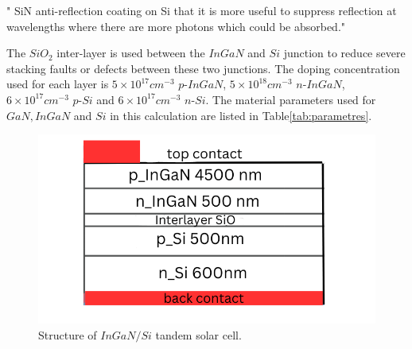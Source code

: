 \documentclass[preprint,12pt]{elsarticle}
\begin{document}
" SiN anti-reflection coating on Si that it is more useful to suppress reflection at wavelengths where there are more photons which could be  absorbed."

The $SiO_{2}$ inter-layer is used between the $InGaN$ and $Si$ junction to reduce severe stacking faults or defects between these two junctions. The doping concentration used for each layer is $5\times10^{17} cm^{-3}$ $p$-$InGaN$, $5\times10^{18} cm^{-3}$ $n$-$InGaN$, $6\times10^{17} cm^{-3}$ $p$-$Si$ and $6\times10^{17} cm^{-3}$ $n$-$Si$. The material parameters used for $GaN, InGaN$ and $Si$ in this calculation are listed in Table\ref{tab:parametres}. 

\begin{figure}[h!]
	\centering
	\includegraphics[width=0.7\linewidth]{Figure/Struct}
	\caption{Structure of $InGaN/Si$ tandem solar cell.}
	\label{fig:structure}
\end{figure}
\end{document}
